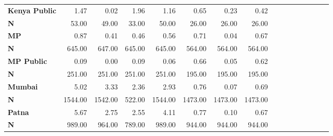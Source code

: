 \begin{tabular}{@{\extracolsep{5pt}}lrrrrrrrrrrrrrrr}
{\bf Kenya Public} & 1.47\phantom{***} & 0.02\phantom{***} & 1.96\phantom{***} & 1.16\phantom{***} & 0.65\phantom{***} & 0.23\phantom{***} & 0.42\phantom{***} \\
{\bf N} & 53.00\phantom{***} & 49.00\phantom{***} & 33.00\phantom{***} & 50.00\phantom{***} & 26.00\phantom{***} & 26.00\phantom{***} & 26.00\phantom{***} \\
{\bf MP} & 0.87\phantom{***} & 0.41\phantom{***} & 0.46\phantom{***} & 0.56\phantom{***} & 0.71\phantom{***} & 0.04\phantom{***} & 0.67\phantom{***} \\
{\bf N} & 645.00\phantom{***} & 647.00\phantom{***} & 645.00\phantom{***} & 645.00\phantom{***} & 564.00\phantom{***} & 564.00\phantom{***} & 564.00\phantom{***} \\
{\bf MP Public} & 0.09\phantom{***} & 0.00\phantom{***} & 0.09\phantom{***} & 0.06\phantom{***} & 0.66\phantom{***} & 0.05\phantom{***} & 0.62\phantom{***} \\
{\bf N} & 251.00\phantom{***} & 251.00\phantom{***} & 251.00\phantom{***} & 251.00\phantom{***} & 195.00\phantom{***} & 195.00\phantom{***} & 195.00\phantom{***} \\
{\bf Mumbai} & 5.02\phantom{***} & 3.33\phantom{***} & 2.36\phantom{***} & 2.93\phantom{***} & 0.76\phantom{***} & 0.07\phantom{***} & 0.69\phantom{***} \\
{\bf N} & 1544.00\phantom{***} & 1542.00\phantom{***} & 522.00\phantom{***} & 1544.00\phantom{***} & 1473.00\phantom{***} & 1473.00\phantom{***} & 1473.00\phantom{***} \\
{\bf Patna} & 5.67\phantom{***} & 2.75\phantom{***} & 2.55\phantom{***} & 4.11\phantom{***} & 0.77\phantom{***} & 0.10\phantom{***} & 0.67\phantom{***} \\
{\bf N} & 989.00\phantom{***} & 964.00\phantom{***} & 789.00\phantom{***} & 989.00\phantom{***} & 944.00\phantom{***} & 944.00\phantom{***} & 944.00\phantom{***} \\
\hline
\end{tabular}

